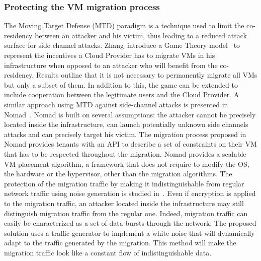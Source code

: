 \subsubsection{Protecting the VM migration process}
The Moving Target Defense (MTD) paradigm is a technique used to limit the co-residency between an attacker and his victim, thus leading to a reduced attack surface for side channel attacks.
Zhang~\etal introduce a Game Theory model~\cite{incentivemtd-Zhang2012} to represent the incentives a Cloud Provider has to migrate VMs in his infrastructure when opposed to an attacker who will benefit from the co-residency. Results outline that it is not necessary to permanently migrate all VMs but only a subset of them. In addition to this, the game can be extended to include cooperation between the legitimate users and the Cloud Provider.
A similar approach using MTD against side-channel attacks is presented in Nomad~\cite{nomad-Moon2015b}. Nomad is built on several assumptions: the attacker cannot be precisely located inside the infrastructure, can launch potentially unknown side channels attacks and can precisely target his victim. 
The migration process proposed in Nomad provides tenants with an API to describe a set of constraints on their VM that has to be respected throughout the migration.
Nomad provides a scalable VM placement algorithm, a framework that does not require to modify the OS, the hardware or the hypervisor, other than the migration algorithms.
The protection of the migration traffic by making it indistinguishable from regular network traffic using noise generation is studied in~\cite{stealth-Achleitner2017a}. Even if encryption is applied to the migration traffic, an attacker located inside the infrastructure may still distinguish migration traffic from the regular one. Indeed, migration traffic can easily be characterized as a set of data bursts through the network. The proposed solution uses a traffic generator to implement a white noise that will dynamically adapt to the traffic generated by the migration. This method will make the migration traffic look like a constant flow of indistinguishable data.

